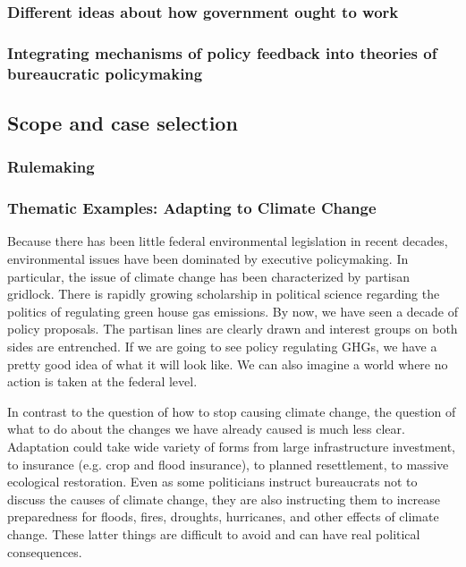 \subsubsection{Different ideas about how government ought to work}
\subsubsection{Integrating mechanisms of policy feedback into theories of bureaucratic policymaking}
\subsection{Scope and case selection}
\subsubsection{Rulemaking}






\subsubsection{Thematic Examples: Adapting to Climate Change}
Because there has been little federal environmental legislation in recent decades, environmental issues have been dominated by executive policymaking. In particular, the issue of climate change has been characterized by partisan gridlock. There is rapidly growing scholarship in political science regarding the politics of regulating green house gas emissions. By now, we have seen a decade of policy proposals. The partisan lines are clearly drawn and interest groups on both sides are entrenched. If we are going to see policy regulating GHGs, we have a pretty good idea of what it will look like. We can also imagine a world where no action is taken at the federal level.

In contrast to the question of how to stop causing climate change, the question of what to do about the changes we have already caused is much less clear. Adaptation could take wide variety of forms from large infrastructure investment, to insurance (e.g. crop and flood insurance), to planned resettlement, to massive ecological restoration. Even as some politicians instruct bureaucrats not to discuss the causes of climate change, they are also instructing them to increase preparedness for floods, fires, droughts, hurricanes, and other effects of climate change. These latter things are difficult to avoid and can have real political consequences. 

